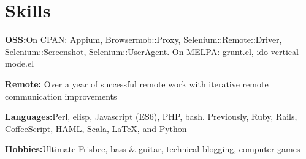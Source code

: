 \section{Skills}
%
\begin{position}
\item[] \textbf{OSS:}\quad On CPAN: Appium, Browsermob::Proxy, Selenium::Remote::Driver, Selenium::Screenshot, Selenium::UserAgent. On MELPA: grunt.el, ido-vertical-mode.el
\item[] \textbf{Remote:} Over a year of successful remote work with iterative remote communication improvements
\item[] \textbf{Languages:}\quad  Perl, elisp, Javascript (ES6), PHP, bash. Previously, Ruby, Rails, CoffeeScript, HAML, Scala, \LaTeX, and Python%
\item[] \textbf{Hobbies:}\quad Ultimate Frisbee, bass \& guitar, technical blogging, computer games
\end{position}
